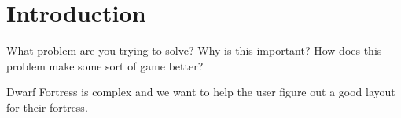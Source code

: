 \section{Introduction}
\label{01}

What problem are you trying to solve? Why is this important? How does this problem make some sort of game better?

Dwarf Fortress is complex and we want to help the user figure out a good layout for their fortress.